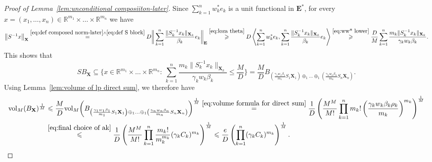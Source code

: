 \documentclass[11pt,reqno]{amsart}
\renewcommand{\le}{\leqslant}
\renewcommand{\ge}{\geqslant}
\newcommand{\X}{\mathbf X}
\newcommand{\R}{\mathbb R}
\theoremstyle{remark}
\renewcommand{\subset}{\subseteq}
\newcommand{\vol}{\mathrm{vol}}
\renewcommand{\1}{\mathbf 1}
\newcommand{\bfE}{\mathbf{E}}
\begin{document}
\begin{proof}[Proof of Lemma~\ref{lem:unconditional composiiton-later}]
Since $\sum_{k=1}^nw_k^*e_k$ is a unit functional in $\bfE^*$, for every $x=(x_1,\ldots,x_n)\in \R^{m_1}\times\ldots\times \R^{m_n}$ we have
$$
\big\|S^{-1}x\big\|_\X\stackrel{\eqref{eq:def composed norm-later}\wedge \eqref{eq:def S block}}{=}D\bigg\|\sum_{k=1}^n \frac{\|S_k^{-1}x_k\|_{\X_k}}{\beta_k}e_k\bigg\|_\bfE\stackrel{\eqref{eq:loza theta}}{\ge} D\left\langle\sum_{k=1}^n w_k^* e_k,\sum_{k=1}^n \frac{\|S_k^{-1}x_k\|_{\X_k}}{\beta_k}e_k\right\rangle  \stackrel{\eqref{eq:ww* lower}}{\ge} \frac{D}{M}\sum_{k=1}^n \frac{m_k\|S_k^{-1}x_k\|_{\X_k}}{\gamma_kw_k\beta_k}.
$$
This shows that
\begin{equation}\label{eq:SBX in l1 sum}
SB_\X\subset  \bigg\{x\in \R^{m_1}\times\ldots\times \R^{m_n}:\ \sum_{k=1}^n \frac{m_k\|S_k^{-1}x_k\|_{\X_k}}{\gamma_kw_k\beta_k}\le \frac{M}{D} \bigg\}=\frac{M}{D}  B_{\left(\frac{\gamma_1w_1\beta_1}{m_1}S_1 \X_1\right)\oplus_1\ldots\oplus_1 \left(\frac{\gamma_nw_n\beta_n}{m_n}S_n\X_n\right)}.
\end{equation}
Using Lemma~\ref{lem:volume of lp direct sum}, we therefore have
\begin{align}\label{eq:volume upper bound compised norm}
\begin{split}
\vol_{M}(B_\X)^{\frac{1}{M}}&\le \frac{M}{D} \vol_{M}\bigg(B_{\left(\frac{\gamma_1w_1\beta_1}{m_1}S_1 \X_1\right)\oplus_1\ldots\oplus_1 \left(\frac{\gamma_nw_n\beta_n}{m_n}S_n\X_n\right)}\bigg)^{\frac{1}{M}}\stackrel{\eqref{eq:volume formula for direct sum}}{=}\frac{1}{D}\left(
\frac{M^M}{M!}\prod_{k=1}^nm_k!\left(\frac{\gamma_kw_k\beta_k\rho_k}{m_k}\right)^{m_k}\right)^{\frac{1}{M}}\\&\stackrel{\eqref{eq:final choice of ak}}{\le} \frac{1}{D}\left(
\frac{M^M}{M!}\prod_{k=1}^n\frac{m_k!}{m_k^{m_k}}(\gamma_kC_k)^{m_k}\right)^{\frac{1}{M}}\le \frac{e}{D}\left(
\prod_{k=1}^n(\gamma_kC_k)^{m_k}\right)^{\frac{1}{M}}.
\end{split}
\end{align}



\end{proof}
\end{document}
